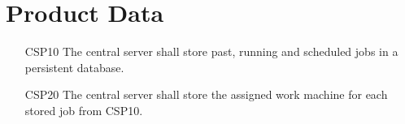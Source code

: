 \section{Product Data}
\begin{enumerate}
  \item[CSP10] The central server shall store past, running and scheduled \glspl{job} in a persistent database.
  \item[CSP20] The central server shall store the assigned work machine for each stored \gls{job} from CSP10.
\end{enumerate}
